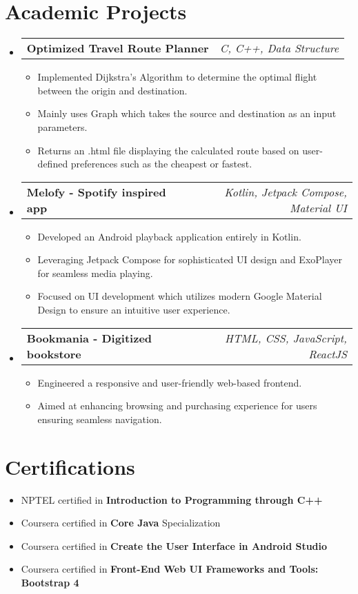 \documentclass[a4paper,20pt]{article}
\makeatletter
\newcommand{\resumeSimpleItem}[2]{
  \item\small{
    {#1}{#2 \vspace{-2pt}}
  }
}
\newcommand{\resumeSkillSubheading}[4]{
  \vspace{-1pt}\item
    \begin{tabular*}{0.98\textwidth}{l@{\extracolsep{\fill}}r}
      \textbf{#1} & \textit{#2} \\
    \end{tabular*}\vspace{-5pt}
}
\newcommand{\resumeSimpleSubItem}[2]{\resumeSimpleItem{#1}{#2}\vspace{-3pt}}
\newcommand{\resumeSubHeadingListStart}{\begin{itemize}[leftmargin=*]}
\newcommand{\resumeSubHeadingListEnd}{\end{itemize}}
\newcommand{\resumeSubHeadingSimpleListStart}{\begin{itemize}[leftmargin=*]}
\newcommand{\resumeSubHeadingSimpleListEnd}{\end{itemize}}
\makeatother
\begin{document}
\section{Academic Projects}
\resumeSubHeadingListStart
\resumeSkillSubheading{Optimized Travel Route Planner}{C, C++, Data Structure}
\vspace {-2pt}
\resumeSubHeadingSimpleListStart
\resumeSimpleSubItem{Implemented Dijkstra’s Algorithm to determine the optimal flight between the origin and destination.}{}
\vspace{2pt}
\resumeSimpleSubItem{Mainly uses Graph which takes the source and destination as an input parameters.}{}
\vspace{2pt}
\resumeSimpleSubItem{Returns an .html file displaying the calculated route based on user-defined preferences such as the cheapest or fastest.}{}
\resumeSubHeadingSimpleListEnd
\vspace{2pt}

\resumeSkillSubheading{Melofy - Spotify inspired app} {Kotlin, Jetpack Compose, Material UI}
\vspace{-2pt}
\resumeSubHeadingSimpleListStart
\resumeSimpleSubItem{Developed an Android playback application entirely in Kotlin.}{}
\vspace{2pt}
\resumeSimpleSubItem{Leveraging Jetpack Compose for sophisticated UI design and ExoPlayer for seamless media playing.}{}
\vspace{2pt}
\resumeSimpleSubItem{Focused on UI development which utilizes modern Google Material Design to ensure an intuitive user experience.}{}
\resumeSubHeadingSimpleListEnd
\vspace{2pt}

\resumeSkillSubheading{Bookmania - Digitized bookstore}{HTML, CSS, JavaScript, ReactJS}
\vspace{-2pt}
\resumeSubHeadingSimpleListStart
\resumeSimpleSubItem {Engineered a responsive and user-friendly web-based frontend.}{}
\vspace{2pt}
\resumeSimpleSubItem{Aimed at enhancing browsing and purchasing experience for users ensuring seamless navigation.}{}
\resumeSubHeadingSimpleListEnd
\resumeSubHeadingListEnd
\vspace{3pt}


\section{Certifications}
\resumeSubHeadingSimpleListStart
\resumeSimpleSubItem {NPTEL certified in \textbf{Introduction to Programming through C++}}{}
\resumeSimpleSubItem {Coursera certified in \textbf{Core Java} Specialization}{}
\resumeSimpleSubItem {Coursera certified in \textbf{Create the User Interface in Android Studio}}{}
\resumeSimpleSubItem {Coursera certified in \textbf{Front-End Web UI Frameworks and Tools: Bootstrap 4}}{}
\resumeSubHeadingSimpleListEnd
\vspace{2pt}
\end{document}

